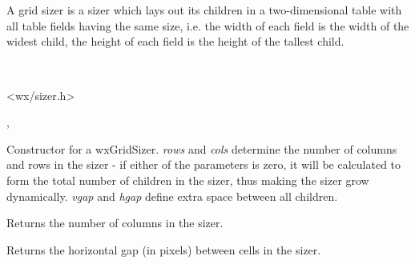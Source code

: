\section{}\label{wxgridsizer}

A grid sizer is a sizer which lays out its children in a two-dimensional
table with all table fields having the same size,
i.e. the width of each field is the width of the widest child,
the height of each field is the height of the tallest child.


\\


<wx/sizer.h>




, 




\label{wxgridsizerwxgridsizer}



Constructor for a wxGridSizer. {\it rows} and {\it cols} determine the number of
columns and rows in the sizer - if either of the parameters is zero, it will be
calculated to form the total number of children in the sizer, thus making the
sizer grow dynamically. {\it vgap} and {\it hgap} define extra space between
all children.

\label{wxgridsizergetcols}


Returns the number of columns in the sizer.


\label{wxgridsizergethgap}


Returns the horizontal gap (in pixels) between cells in the sizer.


\label{wxgridsizergetrows}


